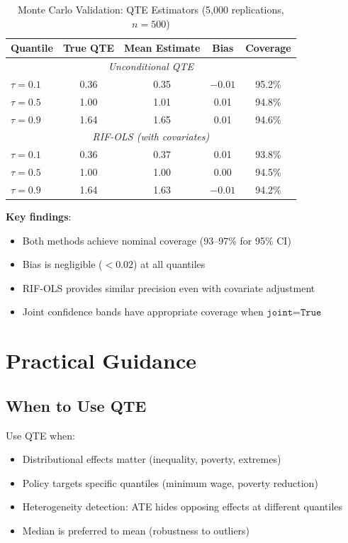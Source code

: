 \begin{table}[htbp]
\centering
\caption{Monte Carlo Validation: QTE Estimators (5,000 replications, $n=500$)}
\label{tab:qte-monte-carlo}
\begin{tabular}{lcccc}
\toprule
Quantile & True QTE & Mean Estimate & Bias & Coverage \\
\midrule
\multicolumn{5}{c}{\textit{Unconditional QTE}} \\
$\tau = 0.1$ & 0.36 & 0.35 & $-0.01$ & 95.2\% \\
$\tau = 0.5$ & 1.00 & 1.01 & 0.01 & 94.8\% \\
$\tau = 0.9$ & 1.64 & 1.65 & 0.01 & 94.6\% \\
\midrule
\multicolumn{5}{c}{\textit{RIF-OLS (with covariates)}} \\
$\tau = 0.1$ & 0.36 & 0.37 & 0.01 & 93.8\% \\
$\tau = 0.5$ & 1.00 & 1.00 & 0.00 & 94.5\% \\
$\tau = 0.9$ & 1.64 & 1.63 & $-0.01$ & 94.2\% \\
\bottomrule
\end{tabular}
\end{table}

\textbf{Key findings}:
\begin{itemize}
    \item Both methods achieve nominal coverage (93--97\% for 95\% CI)
    \item Bias is negligible ($<0.02$) at all quantiles
    \item RIF-OLS provides similar precision even with covariate adjustment
    \item Joint confidence bands have appropriate coverage when $\texttt{joint=True}$
\end{itemize}

\section{Practical Guidance}
\label{sec:qte-guidance}

\subsection{When to Use QTE}

Use QTE when:
\begin{itemize}
    \item Distributional effects matter (inequality, poverty, extremes)
    \item Policy targets specific quantiles (minimum wage, poverty reduction)
    \item Heterogeneity detection: ATE hides opposing effects at different quantiles
    \item Median is preferred to mean (robustness to outliers)
\end{itemize}

